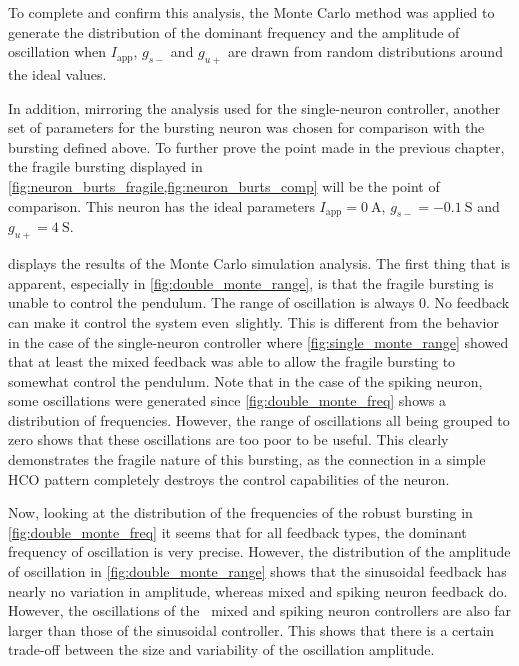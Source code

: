 To complete and confirm this analysis, the Monte Carlo method was applied to generate the distribution of the dominant frequency and the amplitude of oscillation when $I_\text{app}$, $g_{s-}$ and $g_{u+}$ are drawn from random distributions around the ideal values.

In addition, mirroring the analysis used for the single-neuron controller, another set of parameters for the bursting neuron was chosen for comparison with the bursting defined above.
To further prove the point made in the previous chapter, the fragile bursting displayed in \cref{fig:neuron_burts_fragile,fig:neuron_burts_comp} will be the point of comparison.
This neuron has the ideal parameters $I_\text{app} = \qty{0}{\ampere}$, $g_{s-} = \qty{-0.1}{\siemens}$ and $g_{u+} = \qty{4}{\siemens}$.

 displays the results of the Monte Carlo simulation analysis.
The first thing that is apparent, especially in \cref{fig:double_monte_range}, is that the fragile bursting is unable to control the pendulum.
The range of oscillation is always 0.
No feedback can make it control the system even slightly.
This is different from the behavior in the case of the single-neuron controller where \cref{fig:single_monte_range} showed that at least the mixed feedback was able to allow the fragile bursting to somewhat control the pendulum.
Note that in the case of the spiking neuron, some oscillations were generated since \cref{fig:double_monte_freq} shows a distribution of frequencies.
However, the range of oscillations all being grouped to zero shows that these oscillations are too poor to be useful.
This clearly demonstrates the fragile nature of this bursting, as the connection in a simple HCO pattern completely destroys the control capabilities of the neuron.

Now, looking at the distribution of the frequencies of the robust bursting in \cref{fig:double_monte_freq} it seems that for all feedback types, the dominant frequency of oscillation is very precise. However, the distribution of the amplitude of oscillation in \cref{fig:double_monte_range} shows that the sinusoidal feedback has nearly no variation in amplitude, whereas mixed and spiking neuron feedback do.
However, the oscillations of the  mixed and spiking neuron controllers are also far larger than those of the sinusoidal controller.
This shows that there is a certain trade-off between the size and variability of the oscillation amplitude.

